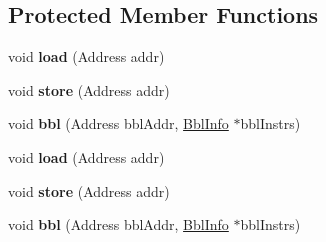 \subsection*{Protected Member Functions}
\begin{DoxyCompactItemize}
\item 
\hypertarget{classSimpleCore_af229788bd793a2e7ef37b89394847a9c}{void {\bfseries load} (Address addr)}\label{classSimpleCore_af229788bd793a2e7ef37b89394847a9c}

\item 
\hypertarget{classSimpleCore_ab1d1e0268bfe241207fddb86b21f2931}{void {\bfseries store} (Address addr)}\label{classSimpleCore_ab1d1e0268bfe241207fddb86b21f2931}

\item 
\hypertarget{classSimpleCore_af8444461b888e88d01fe4a5d2c39c363}{void {\bfseries bbl} (Address bbl\-Addr, \hyperlink{structBblInfo}{Bbl\-Info} $\ast$bbl\-Instrs)}\label{classSimpleCore_af8444461b888e88d01fe4a5d2c39c363}

\item 
\hypertarget{classSimpleCore_af229788bd793a2e7ef37b89394847a9c}{void {\bfseries load} (Address addr)}\label{classSimpleCore_af229788bd793a2e7ef37b89394847a9c}

\item 
\hypertarget{classSimpleCore_ab1d1e0268bfe241207fddb86b21f2931}{void {\bfseries store} (Address addr)}\label{classSimpleCore_ab1d1e0268bfe241207fddb86b21f2931}

\item 
\hypertarget{classSimpleCore_af8444461b888e88d01fe4a5d2c39c363}{void {\bfseries bbl} (Address bbl\-Addr, \hyperlink{structBblInfo}{Bbl\-Info} $\ast$bbl\-Instrs)}\label{classSimpleCore_af8444461b888e88d01fe4a5d2c39c363}

\end{DoxyCompactItemize}
